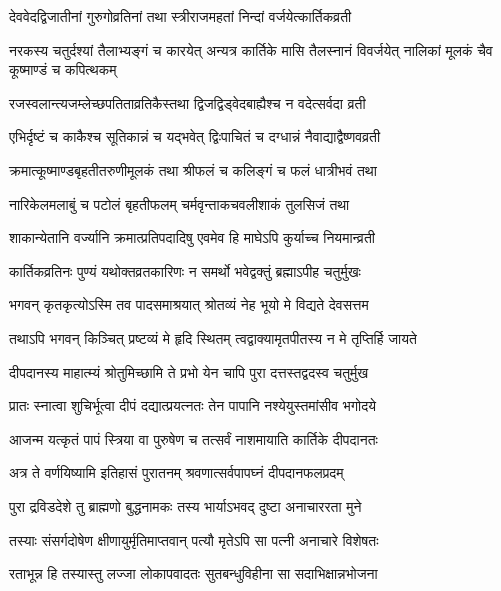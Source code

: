 \twolineshloka
{देववेदद्विजातीनां गुरुगोव्रतिनां तथा}
{स्त्रीराजमहतां निन्दां वर्जयेत्कार्तिकव्रती} %

\threelineshloka
{नरकस्य चतुर्दश्यां तैलाभ्यङ्गं च कारयेत्}
{अन्यत्र कार्तिके मासि तैलस्नानं विवर्जयेत्}
{नालिकां मूलकं चैव कूष्माण्डं च कपित्थकम्} %

\twolineshloka
{रजस्वलान्त्यजम्लेच्छपतिताव्रतिकैस्तथा}
{द्विजद्विड्{}वेदबाह्यैश्च न वदेत्सर्वदा व्रती} %

\twolineshloka
{एभिर्दृष्टं च काकैश्च सूतिकान्नं च यद्भवेत्}
{द्विःपाचितं च दग्धान्नं नैवाद्याद्वैष्णवव्रती} %

\twolineshloka
{क्रमात्कूष्माण्डबृहतीतरुणीमूलकं तथा}
{श्रीफलं च कलिङ्गं च फलं धात्रीभवं तथा} %

\twolineshloka
{नारिकेलमलाबुं च पटोलं बृहतीफलम्}
{चर्मवृन्ताकचवलीशाकं तुलसिजं तथा} %

\twolineshloka
{शाकान्येतानि वर्ज्यानि क्रमात्प्रतिपदादिषु}
{एवमेव हि माघेऽपि कुर्याच्च नियमान्व्रती} %

\twolineshloka
{कार्तिकव्रतिनः पुण्यं यथोक्तव्रतकारिणः}
{न समर्थो भवेद्वक्तुं ब्रह्माऽपीह चतुर्मुखः} %





\twolineshloka
{भगवन् कृतकृत्योऽस्मि तव पादसमाश्रयात्}
{श्रोतव्यं नेह भूयो मे विद्यते देवसत्तम} %

\twolineshloka
{तथाऽपि भगवन् किञ्चित् प्रष्टव्यं मे हृदि स्थितम्}
{त्वद्वाक्यामृतपीतस्य न मे तृप्तिर्हि जायते} %

\twolineshloka
{दीपदानस्य माहात्म्यं श्रोतुमिच्छामि ते प्रभो}
{येन चापि पुरा दत्तस्तद्वदस्व चतुर्मुख} %


\twolineshloka
{प्रातः स्नात्वा शुचिर्भूत्वा दीपं दद्यात्प्रयत्नतः}
{तेन पापानि नश्येयुस्तमांसीव भगोदये} %

\twolineshloka
{आजन्म यत्कृतं पापं स्त्रिया वा पुरुषेण च}
{तत्सर्वं नाशमायाति कार्तिके दीपदानतः} %

\twolineshloka
{अत्र ते वर्णयिष्यामि इतिहासं पुरातनम्}
{श्रवणात्सर्वपापघ्नं दीपदानफलप्रदम्} %

\twolineshloka
{पुरा द्रविडदेशे तु ब्राह्मणो बुद्धनामकः}
{तस्य भार्याऽभवद् दुष्टा अनाचाररता मुने} %

\twolineshloka
{तस्याः संसर्गदोषेण क्षीणायुर्मृतिमाप्तवान्}
{पत्यौ मृतेऽपि सा पत्नी अनाचारे विशेषतः} %

\twolineshloka
{रताभून्न हि तस्यास्तु लज्जा लोकापवादतः}
{सुतबन्धुविहीना सा सदाभिक्षान्नभोजना} %

